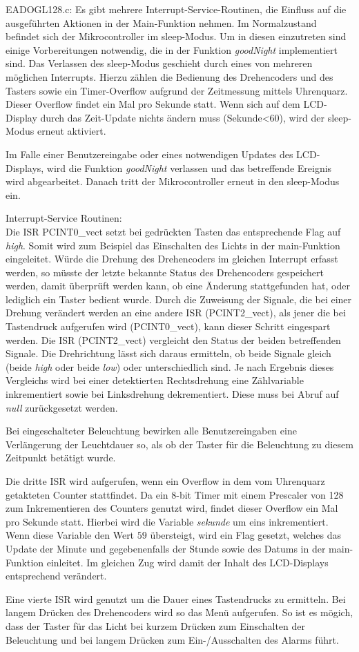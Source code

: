 \documentclass[journal, a4paper]{IEEEtran}
\begin{document}
	EADOGL128.c:
	Es gibt mehrere Interrupt-Service-Routinen, die Einfluss auf die ausgeführten Aktionen in der Main-Funktion nehmen. Im Normalzustand befindet sich der Mikrocontroller im sleep-Modus. Um in diesen einzutreten sind einige Vorbereitungen notwendig, die in der Funktion \emph{goodNight} implementiert sind. Das Verlassen des sleep-Modus geschieht durch eines von mehreren möglichen Interrupts. Hierzu zählen die Bedienung des Drehencoders und des Tasters sowie ein Timer-Overflow aufgrund der Zeitmessung mittels Uhrenquarz. Dieser Overflow findet ein Mal pro Sekunde statt. Wenn sich auf dem LCD-Display durch das Zeit-Update nichts ändern muss (Sekunde<60), wird der sleep-Modus erneut aktiviert. \par
	Im Falle einer Benutzereingabe oder eines notwendigen Updates des LCD-Displays, wird die Funktion \emph{goodNight} verlassen und das betreffende Ereignis wird abgearbeitet. Danach tritt der Mikrocontroller erneut in den sleep-Modus ein.
	
	Interrupt-Service Routinen:\\
	Die ISR PCINT0\_vect setzt bei gedrückten Tasten das entsprechende Flag auf \emph{high}. Somit wird zum Beispiel das Einschalten des Lichts in der main-Funktion eingeleitet.
	Würde die Drehung des Drehencoders im gleichen Interrupt erfasst werden, so müsste der letzte bekannte Status des Drehencoders gespeichert werden, damit überprüft werden kann, ob eine Änderung stattgefunden hat, oder lediglich ein Taster bedient wurde. Durch die Zuweisung der Signale, die bei einer Drehung verändert werden an eine andere ISR (PCINT2\_vect), als jener die bei Tastendruck aufgerufen wird (PCINT0\_vect), kann dieser Schritt eingespart werden. Die ISR (PCINT2\_vect) vergleicht den Status der beiden betreffenden Signale. Die Drehrichtung lässt sich daraus ermitteln, ob beide Signale gleich (beide \emph{high} oder beide \emph{low}) oder unterschiedlich sind. Je nach Ergebnis dieses Vergleichs wird bei einer detektierten Rechtsdrehung eine Zählvariable inkrementiert sowie bei Linksdrehung dekrementiert. Diese muss bei Abruf auf \emph{null} zurückgesetzt werden.\par 
	Bei eingeschalteter Beleuchtung bewirken alle Benutzereingaben eine Verlängerung der Leuchtdauer so, als ob der Taster für die Beleuchtung zu diesem Zeitpunkt betätigt wurde.\par
	Die dritte ISR wird aufgerufen, wenn ein Overflow in dem vom Uhrenquarz getakteten Counter stattfindet. Da ein 8-bit Timer mit einem Prescaler von 128 zum Inkrementieren des Counters genutzt wird, findet dieser Overflow ein Mal pro Sekunde statt. Hierbei wird die Variable \emph{sekunde} um eins inkrementiert. Wenn diese Variable den Wert $59$ übersteigt, wird ein Flag gesetzt, welches das Update der Minute und gegebenenfalls der Stunde sowie des Datums in der main-Funktion einleitet. Im gleichen Zug wird damit der Inhalt des LCD-Displays entsprechend verändert.\par
	Eine vierte ISR wird genutzt um die Dauer eines Tastendrucks zu ermitteln. Bei langem Drücken des Drehencoders wird so das Menü aufgerufen. So ist es mögich, dass der Taster für das Licht bei kurzem Drücken zum Einschalten der Beleuchtung und bei langem Drücken zum Ein-/Ausschalten des Alarms führt.
	
\end{document}
